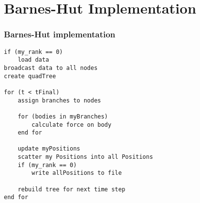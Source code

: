 %
%
%
%
%
\section{Barnes-Hut Implementation}
\begin{frame}[fragile]
  \frametitle{Barnes-Hut implementation}
  \begin{Verbatim}[frame=single, fontsize=\footnotesize]
if (my_rank == 0)
    load data
broadcast data to all nodes
create quadTree

for (t < tFinal) 
    assign branches to nodes

    for (bodies in myBranches)
        calculate force on body
    end for

    update myPositions
    scatter my Positions into all Positions
    if (my_rank == 0)
        write allPositions to file

    rebuild tree for next time step
end for
  \end{Verbatim}
\end{frame}



